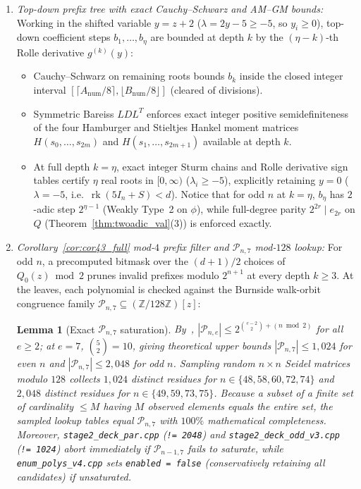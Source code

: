 \documentclass[11pt,reqno]{amsart}
\newtheorem{lemma}[theorem]{Lemma}
\theoremstyle{definition}
\theoremstyle{remark}
\numberwithin{equation}{section}
\numberwithin{table}{section}
\DeclareMathOperator{\rk}{rk}
\begin{document}
\begin{enumerate}
  \item \emph{Top-down prefix tree with exact Cauchy--Schwarz and AM--GM bounds:} Working in the shifted variable $y = z + 2$ ($\lambda = 2y - 5 \ge -5$, so $y_i \ge 0$), top-down coefficient steps $b_1, \dots, b_\eta$ are bounded at depth $k$ by the $(\eta - k)$-th Rolle derivative $g^{(k)}(y)$:
  \begin{itemize}
    \item Cauchy--Schwarz on remaining roots bounds $b_k$ inside the closed integer interval $[\lceil A_{\mathrm{num}}/8 \rceil, \lfloor B_{\mathrm{num}}/8 \rfloor]$ (cleared of divisions).
    \item Symmetric Bareiss $LDL^T$ enforces exact integer positive semidefiniteness of the four Hamburger and Stieltjes Hankel moment matrices $H(s_0, \dots, s_{2m})$ and $H(s_1, \dots, s_{2m+1})$ available at depth $k$.
    \item At full depth $k = \eta$, exact integer Sturm chains and Rolle derivative sign tables certify $\eta$ real roots in $[0, \infty)$ ($\lambda_i \ge -5$), explicitly retaining $y = 0$ ($\lambda = -5$, i.e.\ $\rk(5I_n + S) < d$). Notice that for odd $n$ at $k = \eta$, $b_\eta$ has $2$-adic step $2^{\eta - 1}$ (Weakly Type~2 on $\phi$), while full-degree parity $2^{2r} \mid e_{2r}$ on $Q$ (Theorem~\ref{thm:twoadic_val}(3)) is enforced exactly.
  \end{itemize}
  \item \emph{Corollary~\ref{cor:cor43_full} mod-$4$ prefix filter and $\mathcal{P}_{n,7}$ mod-$128$ lookup:} For odd $n$, a precomputed bitmask over the $(d+1)/2$ choices of $Q_0(z) \bmod 2$ prunes invalid prefixes modulo $2^{n+1}$ at every depth $k \ge 3$. At the leaves, each polynomial is checked against the Burnside walk-orbit congruence family $\mathcal{P}_{n,7} \subseteq (\mathbb{Z}/128\mathbb{Z})[z]$:
  \begin{lemma}[Exact $\mathcal{P}_{n,7}$ saturation]\label{lem:p7_saturation}
  By~\cite[Cor.~3.3 and Cor.~3.13]{GY2019}, $|\mathcal{P}_{n,e}| \le 2^{\binom{e-2}{2} + (n \bmod 2)}$ for all $e \ge 2$; at $e = 7$, $\binom{5}{2} = 10$, giving theoretical upper bounds $|\mathcal{P}_{n,7}| \le 1{,}024$ for even $n$ and $|\mathcal{P}_{n,7}| \le 2{,}048$ for odd $n$. Sampling random $n \times n$ Seidel matrices modulo $128$ collects $1{,}024$ distinct residues for $n \in \{48, 58, 60, 72, 74\}$ and $2{,}048$ distinct residues for $n \in \{49, 59, 73, 75\}$. Because a subset of a finite set of cardinality $\le M$ having $M$ observed elements equals the entire set, the sampled lookup tables equal $\mathcal{P}_{n,7}$ with $100\%$ mathematical completeness. Moreover, \nolinkurl{stage2_deck_par.cpp} (\texttt{!= 2048}) and \nolinkurl{stage2_deck_odd_v3.cpp} (\texttt{!= 1024}) abort immediately if $\mathcal{P}_{n-1,7}$ fails to saturate, while \nolinkurl{enum_polys_v4.cpp} sets \texttt{enabled = false} (conservatively retaining all candidates) if unsaturated.
  \end{lemma}
\end{enumerate}
\end{document}
